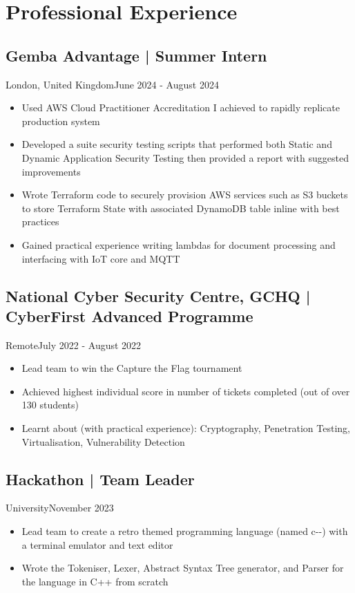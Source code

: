 \section{Professional Experience}
\subsection{Gemba Advantage | Summer Intern}{London, United Kingdom}{June 2024 - August 2024}
\begin{itemize}
    \item Used AWS Cloud Practitioner Accreditation I achieved to rapidly replicate production system
    \item Developed a suite security testing scripts that performed both Static and Dynamic Application Security Testing then provided a report with suggested improvements
    \item Wrote Terraform code to securely provision AWS services such as S3 buckets to store Terraform State with associated DynamoDB table inline with best practices
    \item Gained practical experience writing lambdas for document processing and interfacing with IoT core and MQTT
\end{itemize}
\subsection{National Cyber Security Centre, GCHQ | CyberFirst Advanced Programme}{Remote}{July 2022 - August 2022}
\begin{itemize}
    \item Lead team to win the Capture the Flag tournament
    \item Achieved highest individual score in number of tickets completed (out of over 130 students)
    \item Learnt about (with practical experience): Cryptography, Penetration Testing, Virtualisation, Vulnerability Detection
\end{itemize}
\subsection{Hackathon | Team Leader}{University}{November 2023}
\begin{itemize}
    \item Lead team to create a retro themed programming language (named c-{-}) with a terminal emulator and text editor
    \item Wrote the Tokeniser, Lexer, Abstract Syntax Tree generator, and Parser for the language in C++ from scratch
\end{itemize}
\vspace{.3em}
